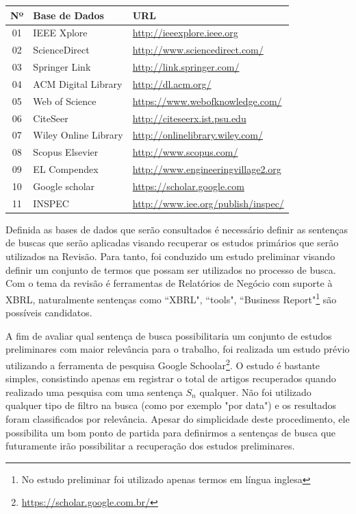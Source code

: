 \documentclass{article}
\begin{document}
\begin{center}
\begin{tabular}{cll}
\label{tab:base-dados}
 Nº&Base de Dados&URL\\
\hline
01 & IEEE Xplore  & \url{http://ieeexplore.ieee.org}\\
02 & ScienceDirect  & \url{http://www.sciencedirect.com/}\\
03 & Springer Link & \url{http://link.springer.com/}\\
04 & ACM Digital Library & \url{http://dl.acm.org/}\\
05 & Web of Science & \url{https://www.webofknowledge.com/}\\
06 & CiteSeer & \url{http://citeseerx.ist.psu.edu}\\
07 & Wiley Online Library & \url{http://onlinelibrary.wiley.com/}\\
08 & Scopus Elsevier & \url{http://www.scopus.com/}\\
09 & EL Compendex & \url{http://www.engineeringvillage2.org}\\
10 & Google scholar & \url{https://scholar.google.com}\\
11 &INSPEC  & \url{http://www.iee.org/publish/inspec/}\\
\end{tabular}
\end{center}


Definida as bases de dados que serão consultados é necessário definir as sentenças de buscas que serão aplicadas visando recuperar os estudos primários que serão utilizados na Revisão. Para tanto, foi conduzido um estudo preliminar visando definir um conjunto de termos que possam ser utilizados no processo de busca. Com o tema da revisão é ferramentas de Relatórios de Negócio com suporte à XBRL, naturalmente sentenças como ``XBRL", ``tools", ``Business Report"\footnote{No estudo preliminar foi utilizado apenas termos em língua inglesa} são possíveis candidatos.

A fim de avaliar qual sentença de busca possibilitaria um conjunto de estudos preliminares com maior relevância para o trabalho, foi realizada um estudo prévio utilizando a ferramenta de pesquisa Google Schoolar\footnote{\url{https://scholar.google.com.br/}}. O estudo é bastante simples, consistindo apenas em registrar o total de artigos recuperados quando realizado uma pesquisa com uma sentença $S_n$ qualquer. Não foi utilizado qualquer tipo de filtro na busca (como por exemplo "por data") e os resultados foram classificados por relevância. Apesar do simplicidade deste procedimento, ele possibilita um bom ponto de partida para definirmos a sentenças de busca que futuramente irão possibilitar a recuperação dos estudos preliminares.
\end{document}
